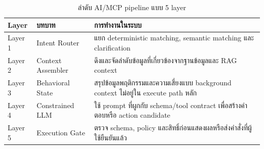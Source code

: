 \begin{table}[H]
    \centering
    \caption{ลำดับ AI/MCP pipeline แบบ 5 layer}
    \label{tab:app_ai_pipeline_loop}
    \renewcommand{\arraystretch}{1.18}
    \small
    \setlength{\tabcolsep}{3pt}
    \begin{tabular}{|L{0.18\textwidth}|L{0.30\textwidth}|L{0.40\textwidth}|}
        \hline
        \textbf{Layer} & \textbf{บทบาท} & \textbf{การทำงานในระบบ} \\ \hline
        Layer 1 & Intent Router & แยก deterministic matching, semantic matching และ clarification \\ \hline
        Layer 2 & Context Assembler & ดึงและจัดลำดับข้อมูลที่เกี่ยวข้องจากฐานข้อมูลและ RAG context \\ \hline
        Layer 3 & Behavioral State & สรุปข้อมูลพฤติกรรมและความเสี่ยงแบบ background context ไม่อยู่ใน execute path หลัก \\ \hline
        Layer 4 & Constrained LLM & ใช้ prompt ที่ผูกกับ schema/tool contract เพื่อสร้างคำตอบหรือ action candidate \\ \hline
        Layer 5 & Execution Gate & ตรวจ schema, policy และสิทธิ์ก่อนแสดงผลหรือส่งคำสั่งที่ผู้ใช้ยืนยันแล้ว \\ \hline
    \end{tabular}
\end{table}
